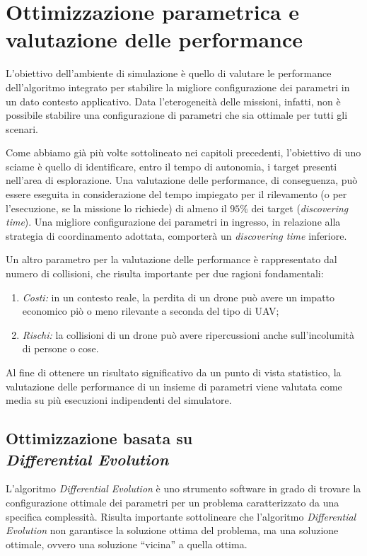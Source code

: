 \chapter{Ottimizzazione parametrica e valutazione delle performance}

L'obiettivo dell'ambiente di simulazione è quello di valutare le performance dell'algoritmo integrato per stabilire la migliore configurazione dei parametri in un dato contesto applicativo.
Data l'eterogeneità delle missioni, infatti, non è possibile stabilire una configurazione di parametri che sia ottimale per tutti gli scenari.

Come abbiamo già più volte sottolineato nei capitoli precedenti, l'obiettivo di uno sciame è quello di identificare, entro il tempo di autonomia, i target presenti nell'area di esplorazione.
Una valutazione delle performance, di conseguenza, può essere eseguita in considerazione del tempo impiegato per il rilevamento (o per l'esecuzione, se la missione lo richiede) di almeno il $95\%$ dei target (\textit{discovering time}).
Una migliore configurazione dei parametri in ingresso, in relazione alla strategia di coordinamento adottata, comporterà un \textit{discovering time} inferiore.

Un altro parametro per la valutazione delle performance è rappresentato dal numero di collisioni, che risulta importante per due ragioni fondamentali:
\begin{enumerate}
    \item \textit{Costi:} in un contesto reale, la perdita di un drone può avere un impatto economico piò o meno rilevante a seconda del tipo di UAV;
    \item \textit{Rischi:} la collisioni di un drone può avere ripercussioni anche sull'incolumità di persone o cose.
\end{enumerate}

Al fine di ottenere un risultato significativo da un punto di vista statistico, la valutazione delle performance di un insieme di parametri viene  valutata come media su più esecuzioni indipendenti del simulatore.

\section{Ottimizzazione basata su \\\textit{Differential Evolution}}

L’algoritmo \textit{Differential Evolution} è uno strumento software in grado di trovare la configurazione ottimale dei parametri per un problema caratterizzato da una specifica complessità. 
Risulta importante sottolineare che l’algoritmo \textit{Differential Evolution} non garantisce la soluzione ottima del problema, ma una soluzione ottimale, ovvero una soluzione “vicina” a quella ottima. 

